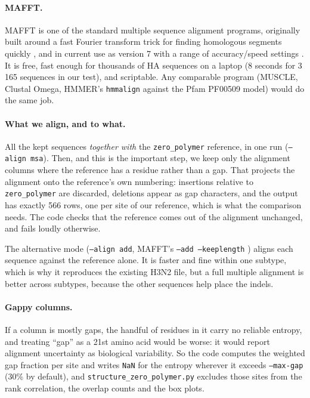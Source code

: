 \documentclass[11pt,a4paper]{article}
\newcommand{\file}[1]{\texttt{#1}}
\begin{document}
\paragraph{MAFFT.}
MAFFT is one of the standard multiple sequence alignment programs, originally
built around a fast Fourier transform trick for finding homologous segments
quickly \cite{katoh2002}, and in current use as version 7 with a range of
accuracy/speed settings \cite{katoh2013}. It is free, fast enough for thousands
of HA sequences on a laptop (8 seconds for 3\,165 sequences in our test), and
scriptable. Any comparable program (MUSCLE, Clustal Omega, HMMER's
\file{hmmalign} against the Pfam PF00509 model) would do the same job.

\paragraph{What we align, and to what.}
All the kept sequences \emph{together with} the \file{zero\_polymer} reference,
in one run (\file{--align msa}). Then, and this is the important step, we keep
only the alignment columns where the reference has a residue rather than a gap.
That projects the alignment onto the reference's own numbering: insertions
relative to \file{zero\_polymer} are discarded, deletions appear as gap
characters, and the output has exactly 566 rows, one per site of our reference,
which is what the comparison needs. The code checks that the reference comes out
of the alignment unchanged, and fails loudly otherwise.

The alternative mode (\file{--align add}, MAFFT's \file{--add --keeplength}
\cite{katoh2012}) aligns each sequence against the reference alone. It is faster
and fine within one subtype, which is why it reproduces the existing H3N2 file,
but a full multiple alignment is better across subtypes, because the other
sequences help place the indels.

\paragraph{Gappy columns.}
If a column is mostly gaps, the handful of residues in it carry no reliable
entropy, and treating ``gap'' as a 21st amino acid would be worse: it would
report alignment uncertainty as biological variability. So the code computes the
weighted gap fraction per site and writes \file{NaN} for the entropy wherever it
exceeds \file{--max-gap} (30\% by default), and
\file{structure\_zero\_polymer.py} excludes those sites from the rank
correlation, the overlap counts and the box plots.
\end{document}
